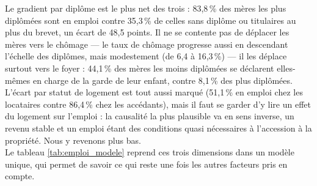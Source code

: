 \documentclass[12pt,a4paper]{article}
\begin{document}
\bigskip

\noindent Le gradient par diplôme est le plus net des trois : 83,8\,\% des mères les plus diplômées sont en emploi contre 35,3\,\% de celles sans diplôme ou titulaires au plus du brevet, un écart de 48,5 points. Il ne se contente pas de déplacer les mères vers le chômage — le taux de chômage progresse aussi en descendant l'échelle des diplômes, mais modestement (de 6,4 à 16,3\,\%) — il les déplace surtout vers le foyer : 44,1\,\% des mères les moins diplômées se déclarent elles-mêmes en charge de la garde de leur enfant, contre 8,1\,\% des plus diplômées. L'écart par statut de logement est tout aussi marqué (51,1\,\% en emploi chez les locataires contre 86,4\,\% chez les accédants), mais il faut se garder d'y lire un effet du logement sur l'emploi : la causalité la plus plausible va en sens inverse, un revenu stable et un emploi étant des conditions quasi nécessaires à l'accession à la propriété. Nous y revenons plus bas. \\

\noindent Le tableau \ref{tab:emploi_modele} reprend ces trois dimensions dans un modèle unique, qui permet de savoir ce qui reste une fois les autres facteurs pris en compte. \\

\bigskip
\end{document}
